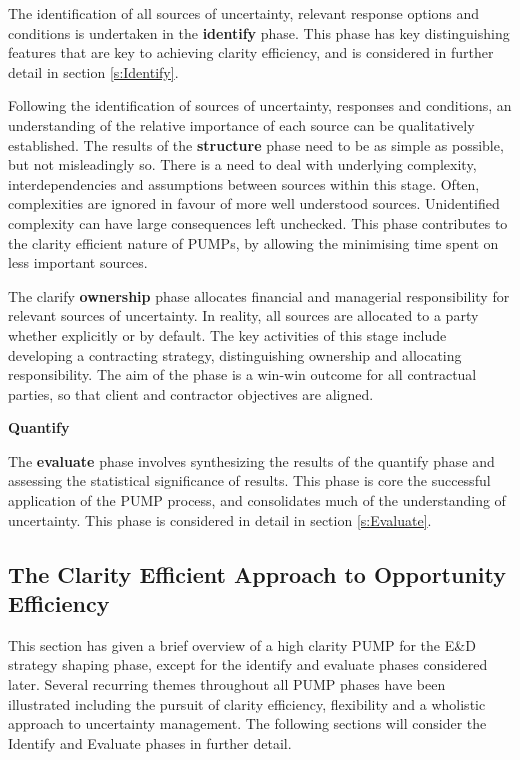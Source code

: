 The identification of all sources of uncertainty, relevant response options and conditions is undertaken in the \textbf{identify} phase.
This phase has key distinguishing features that are key to achieving clarity efficiency, and is considered in further detail in section \ref{s:Identify}.

Following the identification of sources of uncertainty, responses and conditions, an understanding of the relative importance of each source can be qualitatively established.
The results of the \textbf{structure} phase need to be as simple as possible, but not misleadingly so.
There is a need to deal with underlying complexity, interdependencies and assumptions between sources within this stage.
Often, complexities are ignored in favour of more well understood sources.
Unidentified complexity can have large consequences left unchecked.
This phase contributes to the clarity efficient nature of PUMPs, by allowing the minimising time spent on less important sources.

The clarify \textbf{ownership} phase allocates financial and managerial responsibility for relevant sources of uncertainty.
In reality, all sources are allocated to a party whether explicitly or by default.
The key activities of this stage include developing a contracting strategy, distinguishing ownership and allocating responsibility.
The aim of the phase is a win-win outcome for all contractual parties, so that client and contractor objectives are aligned.

\textbf{Quantify}

The \textbf{evaluate} phase involves synthesizing the results of the quantify phase and assessing the statistical significance of results.
This phase is core the successful application of the PUMP process, and consolidates much of the understanding of uncertainty.
This phase is considered in detail in section \ref{s:Evaluate}.


\subsection{The Clarity Efficient Approach to Opportunity Efficiency}
This section has given a brief overview of a high clarity PUMP for the E\&D strategy shaping phase, except for the identify and evaluate phases considered later.
Several recurring themes throughout all PUMP phases have been illustrated including the pursuit of clarity efficiency, flexibility and a wholistic approach to uncertainty management.
The following sections will consider the Identify and Evaluate phases in further detail.



